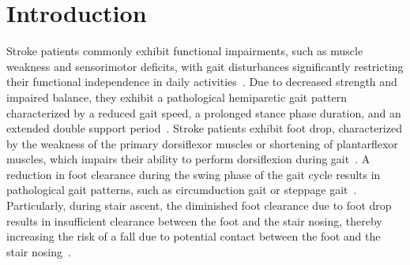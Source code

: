 \documentclass[actuators,article,accept,pdftex,moreauthors]{Definitions/mdpi}
\begin{document}



\section{Introduction}
Stroke patients commonly exhibit functional impairments, such as muscle weakness and sensorimotor deficits, with gait disturbances significantly restricting their functional independence in daily activities~\cite{Carolee2016,Perry1995,Bohannon2007}. Due to decreased strength and impaired balance, they exhibit a pathological hemiparetic gait pattern characterized by a reduced gait speed, a prolonged stance phase duration, and an extended double support period~\cite{woolley2001,Sandra1996}. Stroke patients exhibit foot drop, characterized by the weakness of the primary dorsiflexor muscles or shortening of plantarflexor muscles, which impairs their ability to perform dorsiflexion during gait~\cite{Balaban2014,Ramsay2014,Moseley1993}. A reduction in foot clearance during the swing phase of the gait cycle results in pathological gait patterns, such as circumduction gait or steppage gait~\cite{Chen2005,Li2018,Mufadal2006,Roche2015}. Particularly, during stair ascent, the diminished foot clearance due to foot drop results in insufficient clearance between the foot and the stair nosing, thereby increasing the risk of a fall due to potential contact between the foot and the stair nosing~\cite{Agha2021}.
\end{document}

